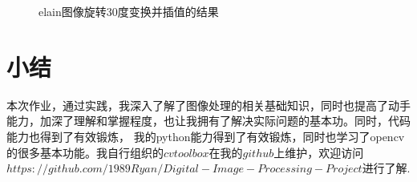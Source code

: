\documentclass[UTF8]{ctexart}
\begin{document}
\begin{figure}[h!]
	\centering
	\hspace{0.1in} 
	\hspace{0.1in} 
	\caption{elain图像旋转30度变换并插值的结果} 
	\label{rotation_result2} %
\end{figure}

\section{小结}

本次作业，通过实践，我深入了解了图像处理的相关基础知识，同时也提高了动手能力，加深了理解和掌握程度，也让我拥有了解决实际问题的基本功。同时，代码能力也得到了有效锻炼，
我的python能力得到了有效锻炼，同时也学习了opencv的很多基本功能。我自行组织的$cv toolbox$在我的$github$上维护，欢迎访问 \newline $https://github.com/1989Ryan/Digital-Image-Processing-Project$进行了解.

\newpage
\end{document}
